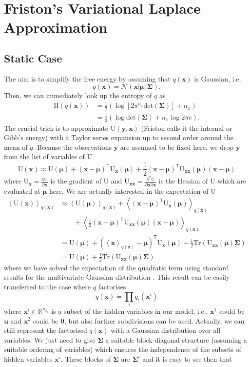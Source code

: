 \documentclass[a4paper,10pt]{article}
\newcommand{\bs}[1]{\mathbf{#1}}					%
\newcommand{\bgs}[1]{\boldsymbol{#1}}				%
\newcommand{\pd}[2]{\frac{\partial #1}{\partial #2}} 	%
\newcommand{\ppd}[3]{\frac{\partial^2 #1}{\partial #2 \partial #3}} %
\newcommand{\tr}{\mathsf{T}}				%
\newcommand{\eq}[1]{\begin{equation} #1 \end{equation}}%
\newcommand{\trace}[1]{\mathrm{Tr}\left(#1\right)}					%
\renewcommand{\ss}{u}         %
\newcommand{\so}{y}         %
\newcommand{\sh}{x}         %
\renewcommand{\sp}{\theta}    %
\newcommand{\ps}{\bs{\ss}}    %
\newcommand{\po}{\bs{\so}}    %
\newcommand{\ph}{\bs{\sh}}    %
\newcommand{\pp}{\bgs{\sp}} %
\newcommand{\E}[2][]{\left\langle #2 \right\rangle_{#1}}	%
\newcommand{\Ent}{\mathrm{H}}			%
\newcommand{\U}{\mathrm{U}}			%
\newcommand{\N}{\mathcal{N}}			%
\newcommand{\R}{\mathbb{R}}				%
\newcommand{\Cov}{\bgs{\Sigma}}			%
\renewcommand{\det}[1]{\mathrm{det}(#1)}	%
\begin{document}
\section{Friston's Variational Laplace Approximation}
\subsection{Static Case}
The aim is to simplify the free energy by assuming that $q(\ph)$ is Gaussian, i.e.,
\eq{
    q(\ph) = \N(\ph|\bgs{\mu},\Cov).
}
Then, we can immediately look up the entropy of $q$ \citep[][eq. (366)]{Petersen2008} as
\eq{\begin{split}
    \Ent(q(\ph)) &= \frac{1}{2} \left(\log [2\pi^{n_\sh} \det{\Cov}] + n_\sh\right) \\
                 &= \frac{1}{2} \left(\log \det{\Cov} + n_\sh \log 2\pi e\right).
\end{split}}
The crucial trick is to approximate $\U(\po,\ph)$ (Friston calls it the internal or Gibb's energy) with a Taylor series expansion up to second order around the mean of $q$. Because the observations $\po$ are assumed to be fixed here, we drop $\po$ from the list of variables of $\U$
\eq{
    \U(\ph) \approx \U(\bgs{\mu}) + (\ph - \bgs{\mu})^\tr \U_\ph(\bgs{\mu}) + \frac{1}{2}(\ph - \bgs{\mu})^\tr \U_{\ph\ph}(\bgs{\mu}) (\ph - \bgs{\mu})
}
where $\U_\ph = \pd{\U}{\ph}$ is the gradient of $\U$ and $\U_{\ph\ph} = \ppd{\U}{\ph}{\ph}$ is the Hessian of $\U$ which are evaluated at $\bgs{\mu}$ here. We are actually interested in the expectation of $\U$
\begin{align}
    \E[q(\ph)]{\U(\ph)} &\approx 
            \E[q(\ph)]{\U(\bgs{\mu})} + \E[q(\ph)]{(\ph - \bgs{\mu})^\tr \U_\ph(\bgs{\mu})}\nonumber\\
               & \qquad + \E[q(\ph)]{\frac{1}{2}(\ph - \bgs{\mu})^\tr \U_{\ph\ph}(\bgs{\mu}) (\ph - \bgs{\mu})}\\
        &= \U(\bgs{\mu}) + \left(\E[q(\ph)]{\ph} - \bgs{\mu}\right)^\tr \U_\ph(\bgs{\mu}) + \frac{1}{2}\trace{\U_{\ph\ph}(\bgs{\mu})\Cov}\\
        &= \U(\bgs{\mu}) + \frac{1}{2}\trace{\U_{\ph\ph}(\bgs{\mu})\Cov}
\end{align}
where we have solved the expectation of the quadratic term using standard results for the multivariate Gaussian distribution \citep[][eq. (357)]{Petersen2008}. This result can be easily transferred to the case where $q$ factorises
\eq{
    q(\ph) = \prod_i q_i(\ph^i)
}
where $\ph^i \in \R^{n_{\sh_i}}$ is a subset of the hidden variables in our model, i.e., $\ph^1$ could be $\ps$ and $\ph^2$ could be $\pp$, but also further subdivisions can be used. Actually, we can still represent the factorised $q(\ph)$ with a Gaussian distribution over all variables. We just need to give $\Cov$ a suitable block-diagonal structure (assuming a suitable ordering of variables) which ensures the independence of the subsets of hidden variables $\ph^i$. These blocks of $\Cov$ are $\Cov^i$ and it is easy to see then that
\end{document}
